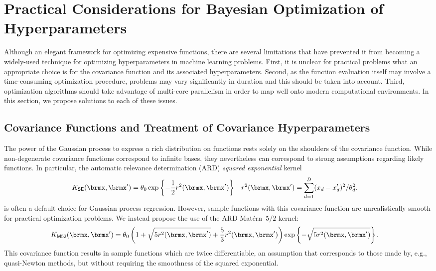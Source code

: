 \documentclass[aos,preprint]{imsart}
\begin{document}
\section{Practical Considerations for Bayesian Optimization of Hyperparameters}

\label{sec:practical}
Although an elegant framework for optimizing expensive functions,
there are several limitations that have prevented it from becoming a
widely-used technique for optimizing hyperparameters in machine
learning problems.  First, it is unclear for practical problems what
an appropriate choice is for the covariance function and its
associated hyperparameters.  Second, as the function evaluation itself
may involve a time-consuming optimization procedure, problems may vary
significantly in duration and this should be taken into account.
Third, optimization algorithms should take advantage of multi-core
parallelism in order to map well onto modern computational
environments.  In this section, we propose solutions to each of these
issues.

\subsection{Covariance Functions and Treatment of Covariance Hyperparameters}
\label{sec:covariances}
The power of the Gaussian process to express a rich distribution on
functions rests solely on the shoulders of the covariance function.
While non-degenerate covariance functions correspond to infinite
bases, they nevertheless can correspond to strong assumptions
regarding likely functions.  In particular, the automatic relevance
determination (ARD) \emph{squared exponential} kernel 
\begin{align}
  K_{\sf{SE}}(\brmx,\brmx') &= \theta_0\exp\left\{-\frac{1}{2}r^2(\brmx,\brmx')\right\}
  &
  r^2(\brmx,\brmx') &= \sum^D_{d=1}(x_d-x'_d)^2/\theta_d^2.
\end{align}
is often a default choice for Gaussian process regression.  However,
sample functions with this covariance function are unrealistically
smooth for practical optimization problems.  We instead propose the
use of the ARD Mat\'{e}rn~$5/2$ kernel:
\begin{align}
  K_{\sf{M52}}(\brmx,\brmx') &= \theta_0
  \left(
  1+ \sqrt{5 r^2(\brmx,\brmx')} + \frac{5}{3}r^2(\brmx,\brmx')
  \right)
  \exp\left\{-\sqrt{5 r^2(\brmx,\brmx')}\right\}.
\end{align}
This covariance function results in sample functions which are
twice differentiable, an assumption that corresponds to those made by,
e.g., quasi-Newton methods, but without requiring the smoothness of
the squared exponential.
\end{document}
